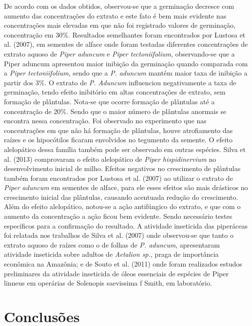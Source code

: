 \documentclass[article,12pt,onesidea,4paper,english,brazil]{abntex2}
\begin{document}
	De acordo com os dados obtidos, observou-se que a germinação decresce com aumento das concentrações do extrato e este fato é bem mais evidente nas concentrações mais elevadas em que não foi registrado valores de germinação, concentração em 30\%. Resultados semelhantes foram encontrados por Lustosa et al. (2007), em sementes de alface onde foram testadas diferentes concentrações de extrato aquoso de \textit{Piper aduncum} e \textit{Piper tectoniifolium}, observando-se que a Piper aduncum apresentou maior inibição da germinação quando comparada com a \textit{Piper tectoniifolium}, sendo que a \textit{P. aduncum} mantém maior taxa de inibição a partir dos 3\%. 
	O extrato de \textit{P. Aduncum} influenciou negativamente a taxa de germinação, tendo efeito inibitório em altas concentrações de extrato, sem formação de plântulas. Nota-se que ocorre formação de plântulas até a concentração de 20\%. Sendo que o maior número de plântulas anormais se encontra nessa concentração. 
	Foi observado no experimento que nas concentrações em que não há formação de plântulas, houve atrofiamento das raízes e os hipocótilos ficaram envolvidos no tegumento da semente. O efeito alelopático dessa família também pode ser observado em outras espécies. Silva et al. (2013) comprovaram o efeito alelopático de \textit{Piper hispidinervium} no desenvolvimento inicial de milho. Efeitos negativos no crescimento de plântulas também foram encontrados por Lustosa et al. (2007) ao utilizar o extrato de \textit{Piper aduncum} em sementes de alface, para ele esses efeitos são mais drásticos no crescimento inicial das plântulas, causando acentuada redução do crescimento. 
	Além do efeito alelopático, notou-se a ação antifúngico do extrato, e que com o aumento da concentração a ação ficou bem evidente. Sendo necessário testes específicos para a confirmação do resultado. A atividade inseticida das piperáceas foi relatada nos trabalhos de Silva et al. (2007) onde observou-se que tanto o extrato aquoso de raízes como o de folhas de \textit{P. aduncum}, apresentaram atividade inseticida sobre adultos de \textit{Aetalion sp.}, praga de importância econômica na Amazônia; e de Souto et al. (2011) onde foram realizados estudos preliminares da atividade inseticida de óleos essenciais de espécies de Piper linneus em operárias de Solenopis saevissima f Smith, em laboratório.
	
	
	\section*{Conclusões}
	
\end{document}
